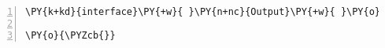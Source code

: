 \begin{Verbatim}[commandchars=\\\{\},numbers=left,firstnumber=1,stepnumber=1,frame=single,fontsize=\small]
\PY{k+kd}{interface}\PY{+w}{ }\PY{n+nc}{Output}\PY{+w}{ }\PY{o}{\PYZob{}}

\PY{o}{\PYZcb{}}
\end{Verbatim}
